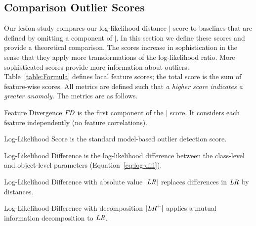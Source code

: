 \documentclass[conference]{IEEEtran}
\begin{document}
\subsection{Comparison Outlier Scores} Our lesion study compares our log-likelihood distance  $\mid$ score to baselines that are defined by omitting a component of $\mid$. In this section we define these scores  and provide a theoretical comparison. The scores increase in sophistication in the sense that they apply more transformations of the log-likelihood ratio. 
More sophisticated scores provide more information about outliers.   
Table~\ref{table:Formula} defines local feature scores; the total score is the sum of feature-wise scores. All metrics are defined such that {\em a higher score indicates a greater anomaly.} The metrics are as follows. 

\begin{LaTeXdescription}
\item[Feature Divergence $\it{FD}$] is the first  component of the $\mid$ score. It considers each feature independently (no feature correlations).
%							
\item[Log-Likelihood Score \loglikelihood] is the standard model-based outlier detection score.
\item[Log-Likelihood Difference \lr] is the log-likelihood difference between the class-level and object-level parameters (Equation~\ref{eq:log-diff}). 
\item[Log-Likelihood Difference with absolute value $|\it{LR}|$] replaces differences in $\it{LR}$ by distances.
\item[Log-Likelihood Difference with decomposition $|\it{LR}^{+}|$] applies a mutual information decomposition to $\it{LR}$.
\end{LaTeXdescription}
\end{document}
